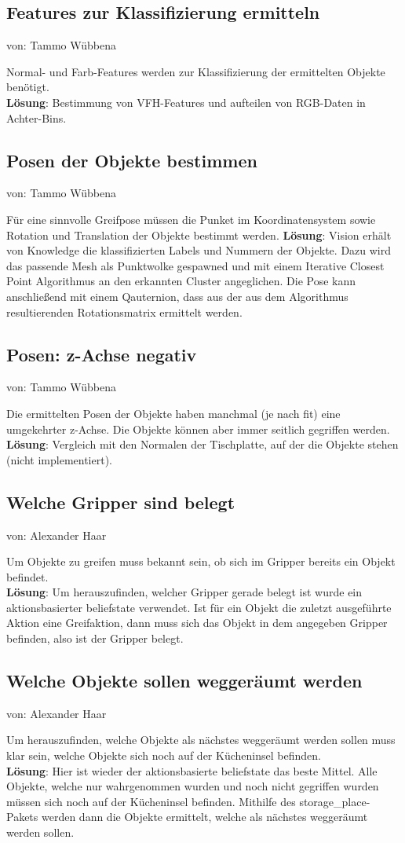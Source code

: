 \documentclass{suturo}
\makeatletter
\newcommand{\chapterauthor}[1]{%
  {\parindent0pt\vspace*{-27pt}%
  \linespread{0}\small\begin{flushright}von: #1\end{flushright}%
  \par\nobreak\vspace*{0pt}}
  \@afterheading%
}
\makeatother
\begin{document}
\subsection{Features zur Klassifizierung ermitteln}
\chapterauthor{Tammo Wübbena}
Normal- und Farb-Features werden zur Klassifizierung der ermittelten Objekte benötigt. \\
\textbf{Lösung}: Bestimmung von VFH-Features und aufteilen von RGB-Daten in Achter-Bins.

\subsection{Posen der Objekte bestimmen}
\chapterauthor{Tammo Wübbena}
Für eine sinnvolle Greifpose müssen die Punket im Koordinatensystem sowie Rotation und Translation der Objekte bestimmt werden. 
\textbf{Lösung}: Vision erhält von Knowledge die klassifizierten Labels und Nummern der Objekte. Dazu wird das passende Mesh als Punktwolke gespawned und mit einem Iterative Closest Point Algorithmus an den erkannten Cluster angeglichen. Die Pose kann anschließend mit einem Qauternion, dass aus der aus dem Algorithmus resultierenden Rotationsmatrix ermittelt werden.

\subsection{Posen: z-Achse negativ}
\chapterauthor{Tammo Wübbena}
Die ermittelten Posen der Objekte haben manchmal (je nach fit) eine umgekehrter z-Achse. Die Objekte können aber immer seitlich gegriffen werden.
\textbf{Lösung}: Vergleich mit den Normalen der Tischplatte, auf der die Objekte stehen (nicht implementiert).

\subsection{Welche Gripper sind belegt}
\chapterauthor{Alexander Haar}
Um Objekte zu greifen muss bekannt sein, ob sich im Gripper bereits ein Objekt befindet.\\
\textbf{Lösung}: Um herauszufinden, welcher Gripper gerade belegt ist wurde ein aktionsbasierter beliefstate verwendet. Ist für ein Objekt die zuletzt ausgeführte Aktion eine Greifaktion, dann muss sich das Objekt in dem angegeben Gripper befinden, also ist der Gripper belegt.

\subsection{Welche Objekte sollen weggeräumt werden}
\chapterauthor{Alexander Haar} 
Um herauszufinden, welche Objekte als nächstes weggeräumt werden sollen muss klar sein, welche Objekte sich noch auf der Kücheninsel befinden.\\
\textbf{Lösung}: Hier ist wieder der aktionsbasierte beliefstate das beste Mittel. Alle Objekte, welche nur wahrgenommen wurden und noch nicht gegriffen wurden müssen sich noch auf der Kücheninsel befinden. Mithilfe des storage\_place- Pakets werden dann die Objekte ermittelt, welche als nächstes weggeräumt werden sollen.
\end{document}

